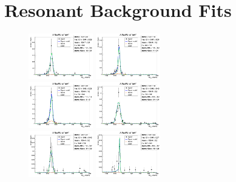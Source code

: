 \chapter{Resonant Background Fits}\label{sec:appendix_hmumu}

\begin{figure}
	\begin{center}
		\includegraphics[width=0.25\textwidth]{fig/hmumu/2016/bkgfit_mu_ggF_1_125.png}
		\includegraphics[width=0.25\textwidth]{fig/hmumu/2016/bkgfit_mu_ggF_2_125.png}\\
		\includegraphics[width=0.25\textwidth]{fig/hmumu/2016/bkgfit_mu_ggF_3_125.png}
		\includegraphics[width=0.25\textwidth]{fig/hmumu/2016/bkgfit_mu_ggF_4_125.png}\\
		\includegraphics[width=0.25\textwidth]{fig/hmumu/2016/bkgfit_mu_VBF_501_125.png}
		\includegraphics[width=0.25\textwidth]{fig/hmumu/2016/bkgfit_mu_VBF_502_125.png}\\

\end{center}
\end{figure}
